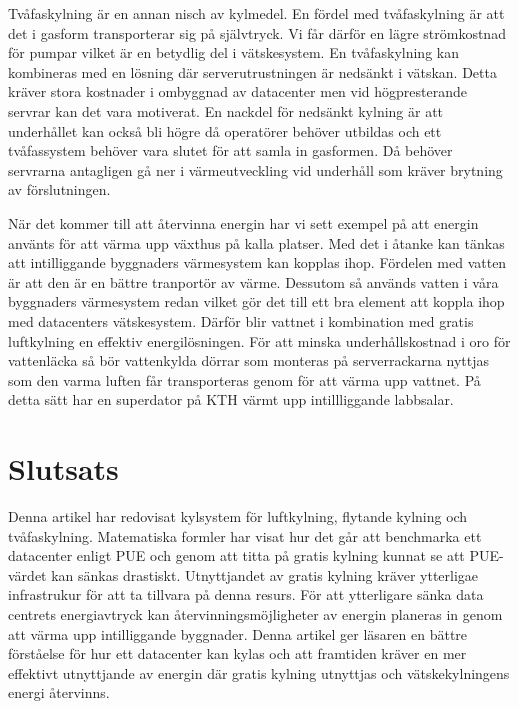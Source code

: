 \documentclass[conference,a4paper]{IEEEtran}
\begin{document}
Tvåfaskylning är en annan nisch av kylmedel. En fördel med tvåfaskylning är att det i gasform transporterar sig på självtryck. Vi får därför en lägre 
strömkostnad för pumpar vilket är en betydlig del i vätskesystem. En tvåfaskylning kan kombineras med en lösning där serverutrustningen är nedsänkt i 
vätskan. Detta kräver stora kostnader \cite{liqcool2} i ombyggnad av datacenter men vid högpresterande servrar kan det vara motiverat. 
En nackdel för nedsänkt kylning är att underhållet kan också bli högre då operatörer behöver utbildas och ett tvåfassystem 
behöver vara slutet för att samla in gasformen. Då behöver servrarna antagligen gå ner i värmeutveckling vid underhåll som kräver brytning av förslutningen.  

När det kommer till att återvinna energin har vi sett exempel på att energin använts för att värma upp växthus på kalla platser. Med det i åtanke kan tänkas att 
intilliggande byggnaders \cite{reuse1} värmesystem kan kopplas ihop. Fördelen med vatten är att den är en bättre tranportör av värme. 
Dessutom så används vatten i våra byggnaders värmesystem redan vilket gör det till ett bra element att koppla ihop med datacenters vätskesystem. Därför blir vattnet i kombination 
med gratis luftkylning en effektiv energilösningen. För att minska underhållskostnad i oro för vattenläcka så bör vattenkylda dörrar som monteras på serverrackarna 
nyttjas som den varma luften får transporteras genom för att värma upp vattnet. På detta sätt har en superdator på KTH värmt upp intillliggande labbsalar.  
\section{Slutsats}
Denna artikel har redovisat kylsystem för luftkylning, flytande kylning och tvåfaskylning. Matematiska formler har visat hur det går att benchmarka ett datacenter enligt PUE och 
genom att titta på gratis kylning kunnat se att PUE-värdet kan sänkas drastiskt. Utnyttjandet av gratis kylning kräver ytterligae infrastrukur för att ta tillvara på denna resurs. 
För att ytterligare sänka data centrets energiavtryck kan återvinningsmöjligheter av energin planeras in genom att värma upp intilliggande byggnader. Denna artikel ger läsaren en 
bättre förståelse för hur ett datacenter kan kylas och att framtiden kräver en mer effektivt utnyttjande av energin där gratis kylning utnyttjas och vätskekylningens energi återvinns. 

\printbibliography
\end{document}
